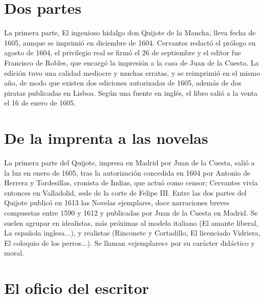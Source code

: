 \documentclass{book}
\begin{document}

\section{Dos partes}

La primera parte, El ingenioso hidalgo don Quijote de la Mancha, lleva fecha de 1605, aunque se imprimió en diciembre de 1604. Cervantes redactó el prólogo en agosto de 1604, el privilegio real se firmó el 26 de septiembre y el editor fue Francisco de Robles, que encargó la impresión a la casa de Juan de la Cuesta. La edición tuvo una calidad mediocre y muchas erratas, y se reimprimió en el mismo año, de modo que existen dos ediciones autorizadas de 1605, además de dos piratas publicadas en Lisboa. Según una fuente en inglés, el libro salió a la venta el 16 de enero de 1605.


\section{De la imprenta a las novelas}

La primera parte del Quijote, impresa en Madrid por Juan de la Cuesta, salió a la luz en enero de 1605, tras la autorización concedida en 1604 por Antonio de Herrera y Tordesillas, cronista de Indias, que actuó como censor; Cervantes vivía entonces en Valladolid, sede de la corte de Felipe III. Entre las dos partes del Quijote publicó en 1613 las Novelas ejemplares, doce narraciones breves compuestas entre 1590 y 1612 y publicadas por Juan de la Cuesta en Madrid. Se suelen agrupar en idealistas, más próximas al modelo italiano (El amante liberal, La española inglesa...), y realistas (Rinconete y Cortadillo, El licenciado Vidriera, El coloquio de los perros...). Se llaman «ejemplares» por su carácter didáctico y moral.


\section{El oficio del escritor}
\end{document}
